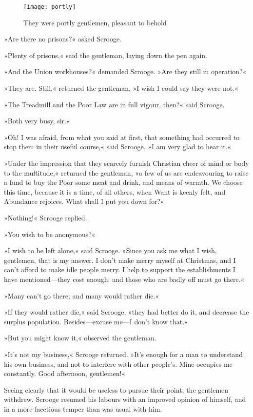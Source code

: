 \begin{figure}[tb]
\centering
  \texttt{[image: portly]}
  \caption{They were portly gentlemen, pleasant to behold}
\end{figure}

»Are there no prisons?« asked Scrooge.

»Plenty of prisons,« said the gentleman, laying down the pen again.

»And the Union workhouses?« demanded Scrooge. »Are they still in operation?«

»They are. Still,« returned the gentleman, »I wish I could say they were not.«

»The Treadmill and the Poor Law are in full vigour, then?« said Scrooge.

»Both very busy, sir.«

»Oh! I was afraid, from what you said at first, that something had occurred to stop them in their useful course,« said Scrooge. »I am very glad to hear it.«

»Under the impression that they scarcely furnish Christian cheer of mind or body to the multitude,« returned the gentleman, »a few of us are endeavouring to raise a fund to buy the Poor some meat and drink, and means of warmth. We choose this time, because it is a time, of all others, when Want is keenly felt, and Abundance rejoices. What shall I put you down for?«

»Nothing!« Scrooge replied.

»You wish to be anonymous?«

»I wish to be left alone,« said Scrooge. »Since you ask me what I wish, gentlemen, that is my answer. I don't make merry myself at Christmas, and I can't afford to make idle people merry. I help to support the establishments I have mentioned---they cost enough: and those who are badly off must go there.«

»Many can't go there; and many would rather die.«

»If they would rather die,« said Scrooge, »they had better do it, and decrease the surplus population. Besides---excuse me---I don't know that.«

»But you might know it,« observed the gentleman.

»It's not my business,« Scrooge returned. »It's enough for a man to understand his own business, and not to interfere with other people's. Mine occupies me constantly. Good afternoon, gentlemen!«

Seeing clearly that it would be useless to pursue their point, the gentlemen withdrew. Scrooge resumed his labours with an improved opinion of himself, and in a more facetious temper than was usual with him.

